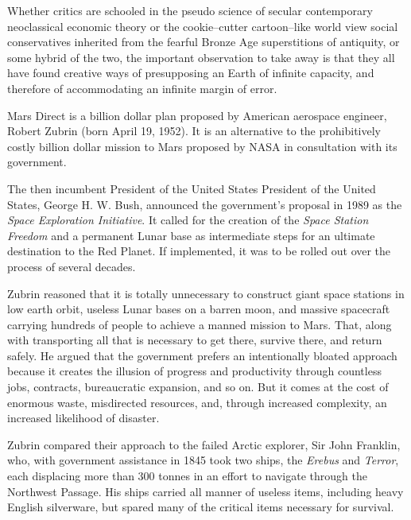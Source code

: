 Whether critics are schooled in the pseudo science of secular contemporary neoclassical economic theory or the cookie--cutter cartoon--like world view social conservatives inherited from the fearful Bronze Age superstitions of antiquity, or some hybrid of the two, the important observation to take away is that they all have found creative ways of presupposing an Earth of infinite capacity, and therefore of accommodating an infinite margin of error.

Mars Direct is a  billion dollar plan proposed by American aerospace engineer, Robert Zubrin (born April 19, 1952). It is an alternative to the prohibitively costly  billion dollar mission to Mars proposed by NASA in consultation with its government.

The then incumbent President of the United States President of the United States, George H. W. Bush, announced the government's proposal in 1989 as the {\it Space Exploration Initiative}. It called for the creation of the {\it Space Station Freedom} and a permanent Lunar base as intermediate steps for an ultimate destination to the Red Planet. If implemented, it was to be rolled out over the process of several decades.

Zubrin reasoned that it is totally unnecessary to construct giant space stations in low earth orbit, useless Lunar bases on a barren moon, and massive spacecraft carrying hundreds of people to achieve a manned mission to Mars. That, along with transporting all that is necessary to get there, survive there, and return safely. He argued that the government prefers an intentionally bloated approach because it creates the illusion of progress and productivity through countless jobs, contracts, bureaucratic expansion, and so on. But it comes at the cost of enormous waste, misdirected resources, and, through increased complexity, an increased likelihood of disaster.

Zubrin compared their approach to the failed Arctic explorer, Sir John Franklin, who, with government assistance in 1845 took two ships, the {\it Erebus} and {\it Terror}, each displacing more than 300 tonnes in an effort to navigate through the Northwest Passage. His ships carried all manner of useless items, including heavy English silverware, but spared many of the critical items necessary for survival. 

